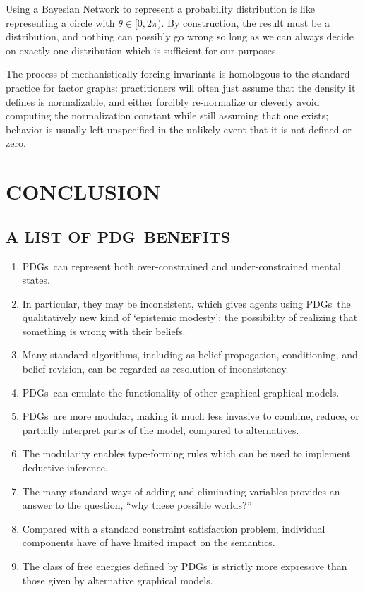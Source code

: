 \documentclass{article}
\newcommand{\MN}{PDG}
\newcommand{\MNs}{\MN s}
\numberwithin{equation}{section}
\begin{document}
\begin{notfocus}
\begin{vfull}
		Using a Bayesian Network to represent a probability distribution is like representing a circle with $\theta \in [0, 2\pi)$.
		By construction, the result must be a distribution, and nothing can possibly go wrong so long as we can always decide on exactly one distribution which is sufficient for our purposes.
		
		
		The process of mechanistically forcing invariants is homologous to the standard practice for factor graphs: practitioners will often just assume that the density it defines is normalizable, and either forcibly re-normalize or cleverly avoid computing the normalization constant while still assuming that one exists; behavior is usually left unspecified in the unlikely event that it is not defined or zero.
	\end{vfull}
	
	\section{CONCLUSION}
	\subsection{A LIST OF \MN\ BENEFITS}\label{sec:list-of-benefits}
	\begin{enumerate}[nosep]
		\item \MNs\ can represent both over-constrained and under-constrained mental states. 
		\item In particular, they may be inconsistent, which gives agents using \MNs\ the qualitatively new kind of `epistemic modesty': the possibility of realizing that something is wrong with their beliefs.
		\item Many standard algorithms, including as belief propogation, conditioning, and belief revision, can be regarded as resolution of inconsistency.
		\item \MNs\ can emulate the functionality of other graphical graphical models.
		\item \MNs\ are more modular, making it much less invasive to combine, reduce, or partially interpret parts of the model, compared to alternatives.
		\item The modularity enables type-forming rules which can be used to implement deductive inference.
		\item The many standard ways of adding and eliminating variables provides an answer to the question, ``why these possible worlds?''
		\item Compared with a standard constraint satisfaction problem, individual components have of have limited impact on the semantics.
		\item The class of free energies defined by \MNs\ is strictly more expressive than those given by alternative graphical models.
	\end{enumerate} %
	

\end{notfocus}
\end{document}
